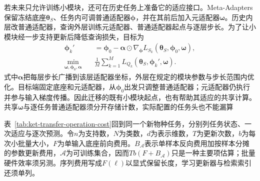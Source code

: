 若未来只允许训练小模块，还可在历史任务上准备它的适应接口。Meta-Adapters保留冻结底座$\bm\theta_S$、任务内可调普通适配器$\bm\phi$，并在其前后加入元适配器$\bm\omega$。历史内层改普通适配器，查询外层训练元适配器、普通适配器起点与逐层步长。为了让小模块经一步支持更新后降低查询损失，目标为
\begin{align}
  \bm\phi_k'
    &=\bm\phi_0-\bm\alpha\odot
       \nabla_{\bm\phi}L_{S_k}
         (\bm{\theta}_S,\bm\phi_0,\bm\omega), \nonumber\\
  \min_{\bm\omega,\bm\phi_0,\bm\alpha}\quad
  &\frac1M\sum_{k=1}^{M}
    L_{Q_k}(\bm{\theta}_S,\bm\phi_k',\bm\omega).
  \label{eq:ket-transfer-meta-adapters}
\end{align}
式中$\bm\alpha$把每层步长广播到该层适配器坐标，外层在规定的模块参数与步长范围内优化。目标端固定底座和元适配器，从$\bm\phi_0$出发只调整普通适配器；元适配器仍执行并参与输入梯度传播。因此迁移的既有小模块起点，也有帮助其适应的共享计算。共享$\bm\omega$与逐任务普通适配器须分开存储计数，实际配置的任务头也不能漏算

表~\ref{tab:ket-transfer-operation-cost}回到同一个新物种任务，分别列任务状态、一次适应与逐次预测。令$n$为支持数，$N$为类数，$d$为表示维数，$T$为更新次数，$b$为每次小批量大小，$F$为单输入底座前向费用。$B_{\mathcal A}$表示单样本反向费用加按样本分摊的参数更新费用，$\mathcal A$为可训练集合，因而$Tb(F+B_{\mathcal A})$只是一种主要项估算；批量硬件效率须另测。序列费用写成$F(\ell)$以显式保留长度，学习更新器与检索索引还须单列。


